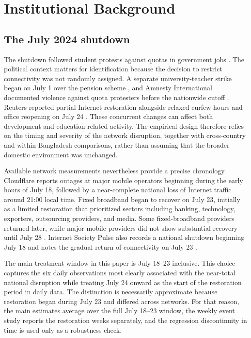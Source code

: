 \section{Institutional Background}
\label{sec:background}

\subsection{The July 2024 shutdown}
\label{sec:shutdown}

The shutdown followed student protests against quotas in government jobs \citep{belson2024}.
The political context matters for identification because the decision to restrict connectivity was not randomly assigned. A separate university-teacher strike began on July 1 over the pension scheme \citep{unb2024strike}, and Amnesty International documented violence against quota protesters before the nationwide cutoff \citep{amnesty2024protests}. Reuters reported partial Internet restoration alongside relaxed curfew hours and office reopening on July 24 \citep{paul2024restoration}. These concurrent changes can affect both development and education-related activity. The empirical design therefore relies on the timing and severity of the network disruption, together with cross-country and within-Bangladesh comparisons, rather than assuming that the broader domestic environment was unchanged.

Available network measurements nevertheless provide a precise chronology. Cloudflare reports outages at major mobile operators beginning during the early hours of July 18, followed by a near-complete national loss of Internet traffic around 21:00 local time. Fixed broadband began to recover on July 23, initially as a limited restoration that prioritized sectors including banking, technology, exporters, outsourcing providers, and media. Some fixed-broadband providers returned later, while major mobile providers did not show substantial recovery until July 28 \citep{belson2024}. Internet Society Pulse also records a national shutdown beginning July 18 and notes the gradual return of connectivity on July 23 \citep{isoc2024}.

The main treatment window in this paper is July 18--23 inclusive. This choice captures the six daily observations most clearly associated with the near-total national disruption while treating July 24 onward as the start of the restoration period in daily data. The distinction is necessarily approximate because restoration began during July 23 and differed across networks. For that reason, the main estimates average over the full July 18--23 window, the weekly event study reports the restoration weeks separately, and the regression discontinuity in time is used only as a robustness check.

